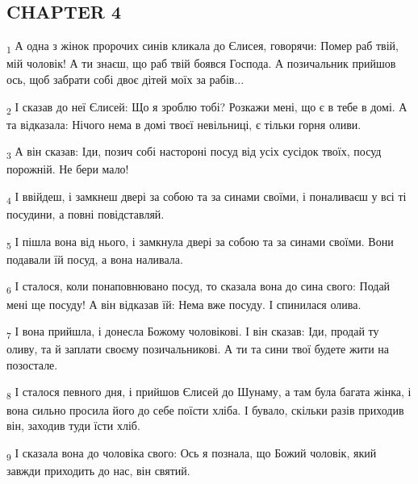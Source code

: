 \subsection{CHAPTER 4}
\begin{tcolorbox}
\textsubscript{1} А одна з жінок пророчих синів кликала до Єлисея, говорячи: Помер раб твій, мій чоловік! А ти знаєш, що раб твій боявся Господа. А позичальник прийшов ось, щоб забрати собі двоє дітей моїх за рабів...
\end{tcolorbox}
\begin{tcolorbox}
\textsubscript{2} І сказав до неї Єлисей: Що я зроблю тобі? Розкажи мені, що є в тебе в домі. А та відказала: Нічого нема в домі твоєї невільниці, є тільки горня оливи.
\end{tcolorbox}
\begin{tcolorbox}
\textsubscript{3} А він сказав: Іди, позич собі настороні посуд від усіх сусідок твоїх, посуд порожній. Не бери мало!
\end{tcolorbox}
\begin{tcolorbox}
\textsubscript{4} І ввійдеш, і замкнеш двері за собою та за синами своїми, і поналиваєш у всі ті посудини, а повні повідставляй.
\end{tcolorbox}
\begin{tcolorbox}
\textsubscript{5} І пішла вона від нього, і замкнула двері за собою та за синами своїми. Вони подавали їй посуд, а вона наливала.
\end{tcolorbox}
\begin{tcolorbox}
\textsubscript{6} І сталося, коли понаповнювано посуд, то сказала вона до сина свого: Подай мені ще посуду! А він відказав їй: Нема вже посуду. І спинилася олива.
\end{tcolorbox}
\begin{tcolorbox}
\textsubscript{7} І вона прийшла, і донесла Божому чоловікові. І він сказав: Іди, продай ту оливу, та й заплати своєму позичальникові. А ти та сини твої будете жити на позостале.
\end{tcolorbox}
\begin{tcolorbox}
\textsubscript{8} І сталося певного дня, і прийшов Єлисей до Шунаму, а там була багата жінка, і вона сильно просила його до себе поїсти хліба. І бувало, скільки разів приходив він, заходив туди їсти хліб.
\end{tcolorbox}
\begin{tcolorbox}
\textsubscript{9} І сказала вона до чоловіка свого: Ось я познала, що Божий чоловік, який завжди приходить до нас, він святий.
\end{tcolorbox}
